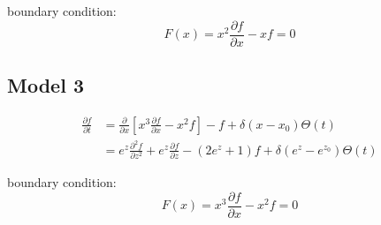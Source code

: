 \documentclass{article}
\begin{document}
    boundary condition:
    \begin{equation}
        F(x) = x^2 \frac{\partial f}{\partial x} - xf = 0
    \end{equation}

\subsection{Model 3}
    \begin{equation}
        \begin{split}
            \frac{\partial f} {\partial t} &= \frac{\partial}{\partial x}
            \left[x^3 \frac{\partial f}{\partial x} - x^2f\right]
             - f
             + \delta(x-x_0)\Theta(t)
             \\
            &= e^{z}\frac{\partial^2 f}{\partial z^2}
            +  e^{z} \frac{\partial f}{\partial z}
            - \left(2e^z+1\right) f
            + \delta(e^{z}-e^{z_0})\Theta(t)
        \end{split}
    \end{equation}

    boundary condition:
    \begin{equation}
        F(x) = x^3 \frac{\partial f}{\partial x} - x^2f = 0
    \end{equation}
\end{document}
